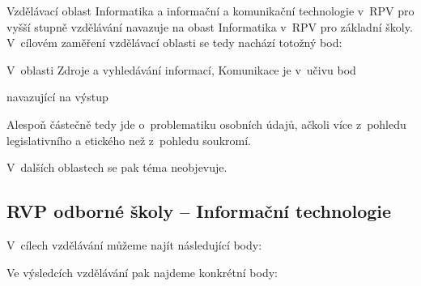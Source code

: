 Vzdělávací oblast Informatika a informační a komunikační technologie v~RPV pro vyšší stupně vzdělávání navazuje na obast Informatika v~RPV pro základní školy. V~cílovém zaměření vzdělávací oblasti se tedy nachází totožný bod:

\begin{displayquote}
	\citep{rvp-g}
\end{displayquote}

V~oblasti Zdroje a vyhledávání informací, Komunikace je v~učivu bod

\begin{displayquote}
	\citep{rvp-g}
\end{displayquote}

navazující na výstup

\begin{displayquote}
	\citep{rvp-g}
\end{displayquote}

Alespoň částečně tedy jde o~problematiku osobních údajů, ačkoli více z~pohledu legislativního a etického než z~pohledu soukromí.

V~dalších oblastech se pak téma neobjevuje. 

\subsection{RVP odborné školy -- Informační technologie}

V~cílech vzdělávání můžeme najít následující body:

\begin{displayquote}
	\citep{rvp-it}
\end{displayquote}

\begin{displayquote}
	\citep{rvp-it}
\end{displayquote}

Ve výsledcích vzdělávání pak najdeme konkrétní body:

